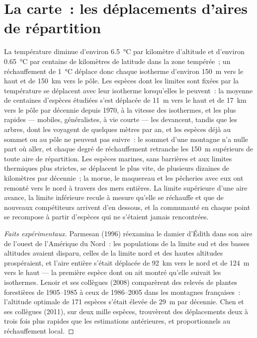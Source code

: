 \section{La carte~: les déplacements d'aires de répartition}

\begin{proposition}\label{prop:b2:global-change:range}
La température diminue d'environ \qty{6.5}{\celsius} par kilomètre
d'altitude et d'environ \qty{0.65}{\celsius} par centaine de kilomètres
de latitude dans la zone tempérée~; un réchauffement de \qty{1}{\celsius}
déplace donc chaque isotherme d'environ \qty{150}{m} vers le haut et de
\qty{150}{km} vers le pôle. Les espèces dont les limites sont fixées par
la température se déplacent avec leur isotherme lorsqu'elles le peuvent~:
la moyenne de centaines d'espèces étudiées s'est déplacée de \qty{11}{m}
vers le haut et de \qty{17}{km} vers le pôle par décennie depuis 1970, à
la vitesse des isothermes, et les plus rapides --- mobiles, généralistes,
à vie courte --- les devancent, tandis que les arbres, dont les 
voyagent de quelques mètres par an, et les espèces déjà au sommet ou au
pôle ne peuvent pas suivre~: le sommet d'une montagne n'a nulle part où
aller, et chaque degré de réchauffement retranche les \qty{150}{m}
supérieurs de toute aire de répartition. Les espèces marines, sans
barrières et aux limites thermiques plus strictes, se déplacent le plus
vite, de plusieurs dizaines de kilomètres par décennie~; la morue, le
maquereau et les pêcheries avec eux ont remonté vers le nord à travers
des mers entières. La limite supérieure d'une aire avance, la limite
inférieure recule à mesure qu'elle se réchauffe et que de nouveaux
compétiteurs arrivent d'en dessous, et la communauté en chaque point se
recompose à partir d'espèces qui ne s'étaient jamais rencontrées.
\end{proposition}
\begin{proof}[Faits expérimentaux]
Parmesan (1996) réexamina le damier d'Édith dans son aire de l'ouest de
l'Amérique du Nord~: les populations de la limite sud et des basses
altitudes avaient disparu, celles de la limite nord et des hautes
altitudes prospéraient, et l'aire entière s'était déplacée de
\qty{92}{km} vers le nord et de \qty{124}{m} vers le haut --- la première
espèce dont on ait montré qu'elle suivait les isothermes. Lenoir et ses
collègues (2008) comparèrent des relevés de plantes forestières de
1905--1985 à ceux de 1986--2005 dans les montagnes françaises~: l'altitude
optimale de 171 espèces s'était élevée de \qty{29}{m} par décennie. Chen
et ses collègues (2011), sur deux mille espèces, trouvèrent des
déplacements deux à trois fois plus rapides que les estimations
antérieures, et proportionnels au réchauffement local.
\end{proof}

